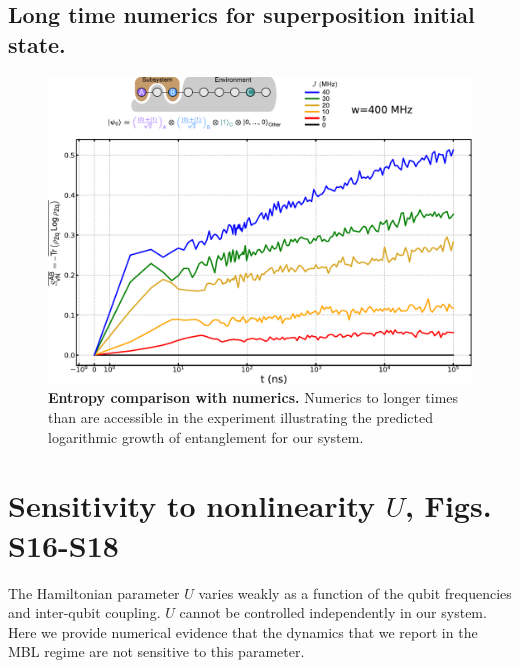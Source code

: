 \subsection{Long time numerics for superposition initial state.}
\begin{figure}
\centering
\includegraphics[width=140mm, keepaspectratio]{./PDF/num_svn_long_time.pdf}
\caption{\textbf{Entropy comparison with numerics.}
Numerics to longer times than are accessible in the experiment illustrating the predicted logarithmic growth of entanglement for our system.
}
\end{figure}

\section{Sensitivity to nonlinearity $U$, Figs.\,S16-S18}
The Hamiltonian parameter $U$ varies weakly as a function of the qubit frequencies and inter-qubit coupling.
$U$ cannot be controlled independently in our system.
Here we provide numerical evidence that the dynamics that we report in the MBL regime are not sensitive to this parameter.
